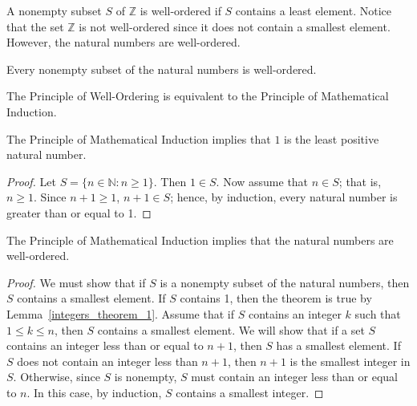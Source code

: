 \medskip

A  nonempty subset $S$ of ${\mathbb Z}$ is {\bfi well-ordered\/} if $S$ contains a least element.  Notice that the set ${\mathbb Z}$ is not well-ordered since it does not contain a smallest element.  However, the natural numbers are well-ordered. 
 
\medskip
 
Every nonempty subset of the natural numbers is well-ordered. 

\medskip
 
The Principle of Well-Ordering is equivalent to the Principle  of Mathematical Induction. 
 
\begin{lemma}\label{integers_theorem_1}
The Principle of Mathematical Induction implies that $1$ is the least positive natural number. 
\end{lemma}

\begin{proof}
Let $S = \{ n \in {\mathbb N} : n \geq 1 \}$. Then $1 \in S$.  Now assume that $n \in S$; that is, $n \geq 1$.  Since $n+1 \geq 1$, $n+ 1 \in S$; hence, by induction, every natural number is greater than or equal to 1. 
\end{proof}

\begin{theorem}\label{integers_theorem_2}
The Principle of Mathematical Induction implies that the natural numbers are well-ordered. 
\end{theorem}
 
\begin{proof}
We must show that if $S$ is a nonempty subset of the natural numbers, then $S$ contains a smallest element.  If $S$ contains 1, then the theorem is true by Lemma~\ref{integers_theorem_1}.  Assume that if $S$ contains an integer $k$ such that $1 \leq k \leq n$, then $S$ contains a smallest element.  We will show that if a set $S$ contains an integer less than or equal to $n + 1$, then $S$ has a smallest element.  If $S$ does not contain an integer less than $n+1$, then $n+1$ is the smallest integer in $S$.  Otherwise, since $S$ is nonempty, $S$ must contain an integer less than or equal to $n$. In this case, by induction, $S$ contains a smallest integer. 
\mbox{\hspace{1in}} 
\end{proof}
 
\medskip
 
